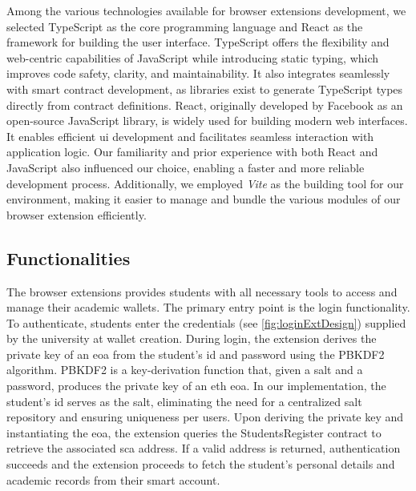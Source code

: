 Among the various technologies available for browser extensions development, we selected TypeScript as the core programming language and React as the framework for building the user interface. TypeScript offers the flexibility and web-centric capabilities of JavaScript while introducing static typing, which improves code safety, clarity, and maintainability. It also integrates seamlessly with smart contract development, as libraries exist to generate TypeScript types directly from contract definitions.
React, originally developed by Facebook as an open-source JavaScript library, is widely used for building modern web interfaces. It enables efficient \gls{ui} development and facilitates seamless interaction with application logic.
Our familiarity and prior experience with both React and JavaScript also influenced our choice, enabling a faster and more reliable development process. Additionally, we employed \textit{Vite} as the building tool for our environment, making it easier to manage and bundle the various modules of our browser extension efficiently.

\subsection{Functionalities}
\label{ssec:extFunctionalities}
The browser extensions provides students with all necessary tools to access and manage their academic wallets. The primary entry point is the login functionality. To authenticate, students enter the credentials (see \cref{fig:loginExtDesign}) supplied by the university at wallet creation. During login, the extension derives the private key of an \acrshort{eoa} from the student's \gls{id} and password using the PBKDF2 algorithm. PBKDF2 is a key-derivation function that, given a \gls{salt} and a password, produces the private key of an \acrlong{eth} \acrlong{eoa}. In our implementation, the student's \gls{id} serves as the \gls{salt}, eliminating the need for a centralized \gls{salt} repository and ensuring uniqueness per users. Upon deriving the private key and instantiating the \acrlong{eoa}, the extension queries the StudentsRegister contract to retrieve the associated \acrlong{sca} address. If a valid address is returned, authentication succeeds and the extension proceeds to fetch the student's personal details and academic records from their smart account.

